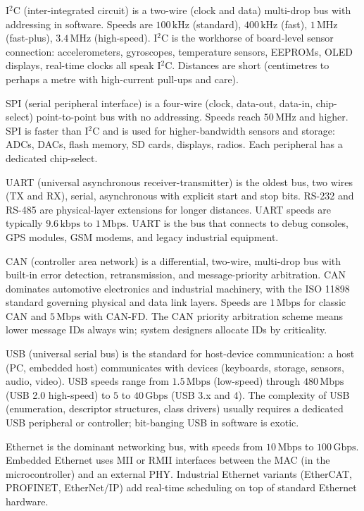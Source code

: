 I$^2$C (inter-integrated circuit) is a two-wire (clock and data) multi-drop bus with addressing in software. Speeds are $100\,\text{kHz}$ (standard), $400\,\text{kHz}$ (fast), $1\,\text{MHz}$ (fast-plus), $3.4\,\text{MHz}$ (high-speed). I$^2$C is the workhorse of board-level sensor connection: accelerometers, gyroscopes, temperature sensors, EEPROMs, OLED displays, real-time clocks all speak I$^2$C. Distances are short (centimetres to perhaps a metre with high-current pull-ups and care).

SPI (serial peripheral interface) is a four-wire (clock, data-out, data-in, chip-select) point-to-point bus with no addressing. Speeds reach $50\,\text{MHz}$ and higher. SPI is faster than I$^2$C and is used for higher-bandwidth sensors and storage: ADCs, DACs, flash memory, SD cards, displays, radios. Each peripheral has a dedicated chip-select.

UART (universal asynchronous receiver-transmitter) is the oldest bus, two wires (TX and RX), serial, asynchronous with explicit start and stop bits. RS-232 and RS-485 are physical-layer extensions for longer distances. UART speeds are typically $9.6\,\text{kbps}$ to $1\,\text{Mbps}$. UART is the bus that connects to debug consoles, GPS modules, GSM modems, and legacy industrial equipment.

CAN (controller area network) is a differential, two-wire, multi-drop bus with built-in error detection, retransmission, and message-priority arbitration. CAN dominates automotive electronics and industrial machinery, with the ISO 11898 standard governing physical and data link layers. Speeds are $1\,\text{Mbps}$ for classic CAN and $5\,\text{Mbps}$ with CAN-FD. The CAN priority arbitration scheme means lower message IDs always win; system designers allocate IDs by criticality.

USB (universal serial bus) is the standard for host-device communication: a host (PC, embedded host) communicates with devices (keyboards, storage, sensors, audio, video). USB speeds range from $1.5\,\text{Mbps}$ (low-speed) through $480\,\text{Mbps}$ (USB 2.0 high-speed) to $5$ to $40\,\text{Gbps}$ (USB 3.x and 4). The complexity of USB (enumeration, descriptor structures, class drivers) usually requires a dedicated USB peripheral or controller; bit-banging USB in software is exotic.

Ethernet is the dominant networking bus, with speeds from $10\,\text{Mbps}$ to $100\,\text{Gbps}$. Embedded Ethernet uses MII or RMII interfaces between the MAC (in the microcontroller) and an external PHY. Industrial Ethernet variants (EtherCAT, PROFINET, EtherNet/IP) add real-time scheduling on top of standard Ethernet hardware.

